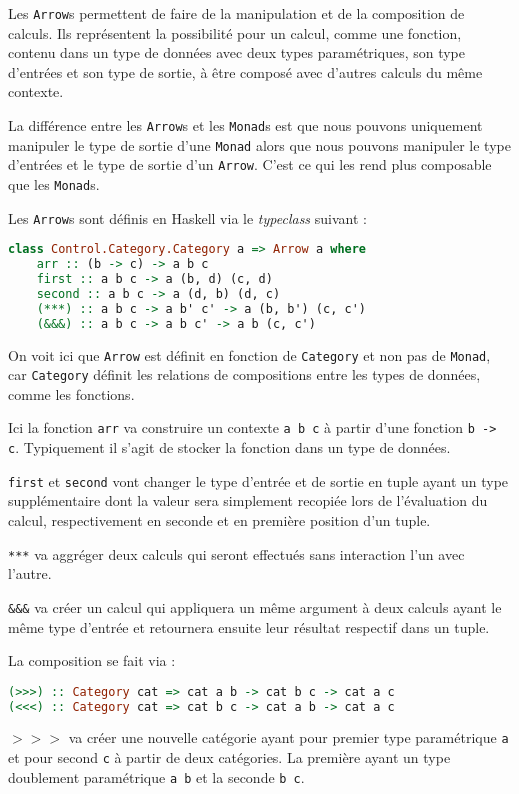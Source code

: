 \documentclass{llncs}
\newcommand{\Arr}{\texttt{Arrow} }
\newcommand{\Arrp}{\texttt{Arrow}. }
\newcommand{\Arrs}{\texttt{Arrow}s }
\begin{document}
Les \Arrs permettent de faire de la manipulation et de la composition de calculs.
Ils représentent la possibilité pour un calcul, comme une fonction, contenu dans un
type de données avec deux types paramétriques, son type d'entrées et son type de sortie,
à être composé avec d'autres calculs du même contexte.

La différence entre les \Arrs et les \texttt{Monad}s est que nous pouvons
uniquement manipuler le type de sortie d'une \texttt{Monad} alors que nous pouvons
manipuler le type d'entrées et le type de sortie d'un \Arrp
C'est ce qui les rend plus composable que les \texttt{Monad}s.

Les \Arrs sont définis en Haskell via le \emph{typeclass} suivant :
\begin{lstlisting}[language=haskell]
class Control.Category.Category a => Arrow a where
    arr :: (b -> c) -> a b c
    first :: a b c -> a (b, d) (c, d)
    second :: a b c -> a (d, b) (d, c)
    (***) :: a b c -> a b' c' -> a (b, b') (c, c')
    (&&&) :: a b c -> a b c' -> a b (c, c')
\end{lstlisting}

On voit ici que \Arr est définit en fonction de \texttt{Category} et non pas
de \texttt{Monad}, car \texttt{Category} définit les relations de compositions entre
les types de données, comme les fonctions.

Ici la fonction \texttt{arr} va construire un contexte \texttt{a b c} à partir d'une
fonction \texttt{b -> c}.
Typiquement il s'agit de stocker la fonction dans un type de données.

\texttt{first} et \texttt{second} vont changer le type d'entrée et de sortie
en tuple ayant un type supplémentaire dont la valeur sera simplement recopiée
lors de l'évaluation du calcul, respectivement en seconde et en première position
d'un tuple.

\texttt{***} va aggréger deux calculs qui seront effectués sans interaction l'un
avec l'autre.

\texttt{\&\&\&} va créer un calcul qui appliquera un même argument à deux calculs ayant
le même type d'entrée et retournera ensuite leur résultat respectif dans un tuple.

La composition se fait via :
\begin{lstlisting}[language=haskell]
(>>>) :: Category cat => cat a b -> cat b c -> cat a c
(<<<) :: Category cat => cat b c -> cat a b -> cat a c
\end{lstlisting}

$>>>$ va créer une nouvelle catégorie ayant pour premier type paramétrique
\texttt{a} et pour second \texttt{c} à partir de deux catégories.
La première ayant un type doublement paramétrique \texttt{a b} et la seconde
\texttt{b c}.
\end{document}
